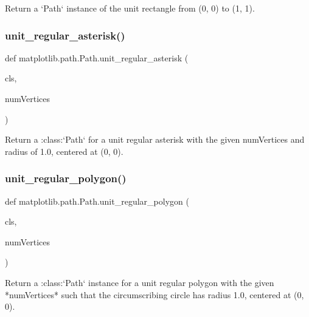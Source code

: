 \begin{DoxyVerb}Return a `Path` instance of the unit rectangle from (0, 0) to (1, 1).
\end{DoxyVerb}
 \mbox{\label{classmatplotlib_1_1path_1_1Path_a34d0d3657f364ed9e06190c8a0efea7a}} 
\subsubsection{\texorpdfstring{unit\+\_\+regular\+\_\+asterisk()}{unit\_regular\_asterisk()}}
{\footnotesize\ttfamily def matplotlib.\+path.\+Path.\+unit\+\_\+regular\+\_\+asterisk (\begin{DoxyParamCaption}\item[{}]{cls,  }\item[{}]{num\+Vertices }\end{DoxyParamCaption})}

\begin{DoxyVerb}Return a :class:`Path` for a unit regular asterisk with the given
numVertices and radius of 1.0, centered at (0, 0).
\end{DoxyVerb}
 \mbox{\label{classmatplotlib_1_1path_1_1Path_a922129b6b590f2a951baa32c1615f110}} 
\subsubsection{\texorpdfstring{unit\+\_\+regular\+\_\+polygon()}{unit\_regular\_polygon()}}
{\footnotesize\ttfamily def matplotlib.\+path.\+Path.\+unit\+\_\+regular\+\_\+polygon (\begin{DoxyParamCaption}\item[{}]{cls,  }\item[{}]{num\+Vertices }\end{DoxyParamCaption})}

\begin{DoxyVerb}Return a :class:`Path` instance for a unit regular polygon with the
given *numVertices* such that the circumscribing circle has radius 1.0,
centered at (0, 0).
\end{DoxyVerb}
 \mbox{\label{classmatplotlib_1_1path_1_1Path_ae2b4fc8eeb290b8708e80a7a0c159f26}} 
